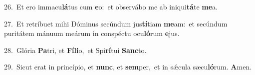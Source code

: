 {\numbfont\textcolor{\numbcolor}{26.}}~Et ero immacu\-\textbf{lá}\-tus cum \textbf{e}\-o:~\star et observábo me ab iniqui\-\textbf{tá}\-te \textbf{me}\-a.\par
{\numbfont\textcolor{\numbcolor}{27.}}~Et retríbuet mihi Dóminus secúndum jus\-\textbf{tí}\-tiam \textbf{me}\-am:~\star et secúndum puritátem mánuum meárum in conspéctu ocu\-\textbf{ló}\-rum \textbf{e}\-jus.\par
{\numbfont\textcolor{\numbcolor}{28.}}~Glória \textbf{Pa}\-tri, et \textbf{Fí}\-\textbf{li}o,~\star et Spi\-\textbf{rí}\-tui \textbf{Sanc}\-to.\par
{\numbfont\textcolor{\numbcolor}{29.}}~Sicut erat in princípio, et \textbf{nunc}\-, et \textbf{sem}\-per,~\star et in sǽcula sæcu\-\textbf{ló}\-rum. \textbf{A}\-men.\par
